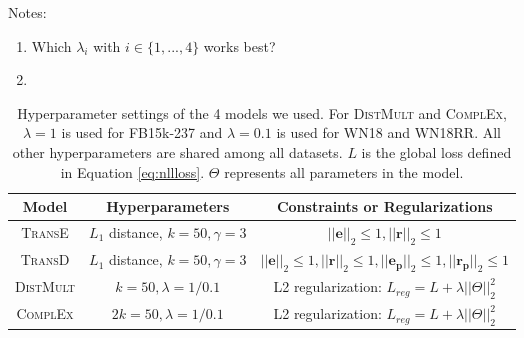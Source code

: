 Notes:\\
\begin{enumerate}
    \item Which $\lambda_i$ with $i \in \{1, ..., 4\}$ works best?
    \item 
\end{enumerate}





\begin{table*}[t]
\centering
\begin{tabular}{|c|c|c|}
\hline
\textbf{Model} & \textbf{Hyperparameters} & \textbf{Constraints or Regularizations}  \\ \hline
\textsc{TransE} & $L_1$ distance, $k=50, \gamma=3$ & $||\mathbf{e}||_2\leq 1,||\mathbf{r}||_2\leq 1$ \\ \hline
\textsc{TransD} & $L_1$ distance, $k=50, \gamma=3$ & $||\mathbf{e}||_2\leq 1,||\mathbf{r}||_2\leq 1,||\mathbf{e_p}||_2\leq 1,||\mathbf{r_p}||_2\leq 1$  \\ \hline
\textsc{DistMult} & $k=50, \lambda=1/0.1$ & L2 regularization: $L_{reg}=L+\lambda||\Theta||_2^2$ \\ \hline
\textsc{ComplEx}  & $2k=50, \lambda=1/0.1$ & L2 regularization: $L_{reg}=L+\lambda||\Theta||_2^2$ \\ \hline
\end{tabular}
\caption{Hyperparameter settings of the 4 models we used. For \textsc{DistMult} and \textsc{ComplEx}, $\lambda=1$ is used for FB15k-237 and $\lambda=0.1$ is used for WN18 and WN18RR. All other hyperparameters are shared among all datasets. $L$ is the global loss defined in Equation \eqref{eq:nllloss}. $\Theta$ represents all parameters in the model.}
\label{tab:hyperparams}
\end{table*}




